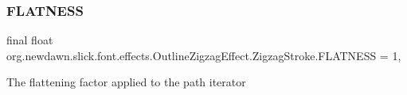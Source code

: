 \subsubsection{\texorpdfstring{F\+L\+A\+T\+N\+E\+SS}{FLATNESS}}
{\footnotesize\ttfamily final float org.\+newdawn.\+slick.\+font.\+effects.\+Outline\+Zigzag\+Effect.\+Zigzag\+Stroke.\+F\+L\+A\+T\+N\+E\+SS = 1\hspace{0.3cm}{\ttfamily [static]}, {\ttfamily [private]}}

The flattening factor applied to the path iterator 